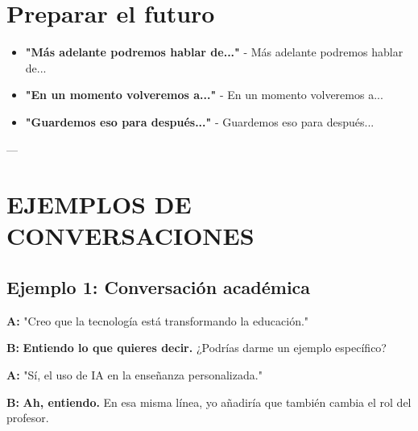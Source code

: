 \documentclass[a4paper,11pt]{article}
\begin{document}
\vspace{0.2cm}

\section{Preparar el futuro}

\begin{itemize}

  \item \textbf{"Más adelante podremos hablar de..."} - Más adelante podremos hablar de...

  \item \textbf{"En un momento volveremos a..."} - En un momento volveremos a...

  \item \textbf{"Guardemos eso para después..."} - Guardemos eso para después...

\end{itemize}

\vspace{0.2cm}

---

\vspace{0.2cm}

\section{EJEMPLOS DE CONVERSACIONES}

\vspace{0.2cm}

\subsection{Ejemplo 1: Conversación académica}

\vspace{0.2cm}

\textbf{A:} "Creo que la tecnología está transformando la educación."

\vspace{0.2cm}

\textbf{B:} \textbf{Entiendo lo que quieres decir.} ¿Podrías darme un ejemplo específico?

\vspace{0.2cm}

\textbf{A:} "Sí, el uso de IA en la enseñanza personalizada."

\vspace{0.2cm}

\textbf{B:} \textbf{Ah, entiendo.} En esa misma línea, yo añadiría que también cambia el rol del profesor.
\end{document}
